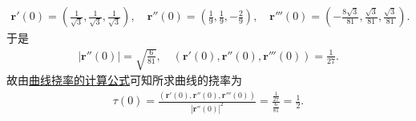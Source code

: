 \documentclass[../../main.tex]{subfiles}%
\begin{document}
\begin{solution}
\begin{align*}
\boldsymbol{r}\prime \left( 0 \right) =\left( \frac{1}{\sqrt{3}},\frac{1}{\sqrt{3}},\frac{1}{\sqrt{3}} \right) ,\quad \boldsymbol{r}'' \left( 0 \right) =\left( \frac{1}{9},\frac{1}{9},-\frac{2}{9} \right) ,\quad \boldsymbol{r}''' \left( 0 \right) =\left( -\frac{8\sqrt{3}}{81},\frac{\sqrt{3}}{81},\frac{\sqrt{3}}{81} \right) .
\end{align*}
于是
\begin{align*}
\left| \boldsymbol{r}'' \left( 0 \right) \right|=\sqrt{\frac{6}{81}},\quad \left( \boldsymbol{r}' \left( 0 \right) ,\boldsymbol{r}'' \left( 0 \right) ,\boldsymbol{r}''' \left( 0 \right) \right) =\frac{1}{27}.
\end{align*}
故由\hyperref[theorem:微分几何-曲线挠率的计算公式]{曲线挠率的计算公式}可知所求曲线的挠率为
\begin{align*}
\tau \left( 0 \right) =\frac{\left( \boldsymbol{r}' \left( 0 \right) ,\boldsymbol{r}'' \left( 0 \right) ,\boldsymbol{r}''' \left( 0 \right) \right)}{\left| \boldsymbol{r}'' \left( 0 \right) \right|^2}=\frac{\frac{1}{27}}{\frac{6}{81}}=\frac{1}{2}.
\end{align*}

\end{solution}
\end{document}
